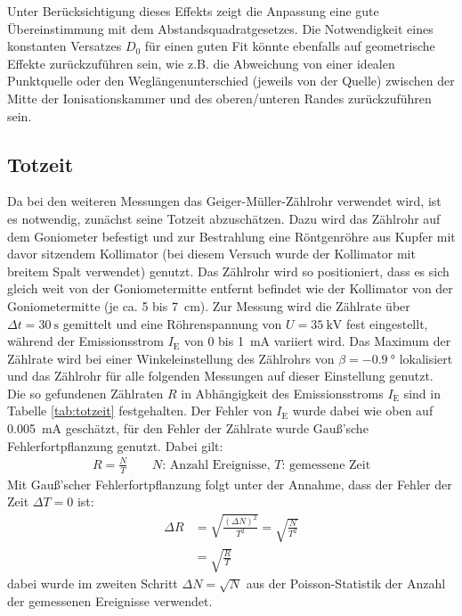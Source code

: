 \documentclass[11pt, a4paper]{article}
\numberwithin{equation}{section}
\begin{document}
Unter Berücksichtigung dieses Effekts zeigt die Anpassung eine gute Übereinstimmung mit dem Abstandsquadratgesetzes.
Die Notwendigkeit eines konstanten Versatzes $D_0$ für einen guten Fit könnte ebenfalls auf geometrische Effekte zurückzuführen sein, wie z.B. die Abweichung von einer idealen Punktquelle oder den Weglängenunterschied (jeweils von der Quelle) zwischen der Mitte der Ionisationskammer und des oberen/unteren Randes zurückzuführen sein.

\subsection{Totzeit}

Da bei den weiteren Messungen das Geiger-Müller-Zählrohr verwendet wird, ist es notwendig, zunächst seine Totzeit abzuschätzen.
Dazu wird das Zählrohr auf dem Goniometer befestigt und zur Bestrahlung eine Röntgenröhre aus Kupfer mit davor sitzendem Kollimator (bei diesem Versuch wurde der Kollimator mit breitem Spalt verwendet) genutzt.
Das Zählrohr wird so positioniert, dass es sich gleich weit von der Goniometermitte entfernt befindet wie der Kollimator von der Goniometermitte (je ca. \num{5} bis \SI{7}{cm}).
Zur Messung wird die Zählrate über $\Delta t=\SI{30}{\second}$ gemittelt und eine Röhrenspannung von $U=\SI{35}{\kilo\volt}$ fest eingestellt, während der Emissionsstrom $I_\text{E}$ von \num{0} bis \SI{1}{\milli\ampere} variiert wird.
Das Maximum der Zählrate wird bei einer Winkeleinstellung des Zählrohrs von $\beta=\SI{-0.9}{\degree}$ lokalisiert und das Zählrohr für alle folgenden Messungen auf dieser Einstellung genutzt.
Die so gefundenen Zählraten $R$ in Abhängigkeit des Emissionsstroms $I_\mathrm{E}$ sind in Tabelle \ref{tab:totzeit} festgehalten.
Der Fehler von $I_\text{E}$ wurde dabei wie oben auf \SI{0.005}{\milli\ampere} geschätzt, für den Fehler der Zählrate wurde Gauß'sche Fehlerfortpflanzung genutzt.
Dabei gilt:
\begin{align}
	R = \frac{N}{T}\qquad\text{$N$: Anzahl Ereignisse, $T$: gemessene Zeit}
\end{align}
Mit Gauß'scher Fehlerfortpflanzung folgt unter der Annahme, dass der Fehler der Zeit $\Delta T=0$ ist:
\begin{align}
	\Delta R &= \sqrt{\frac{(\Delta N)^2}{T^2}} = \sqrt{\frac{N}{T^2}} \nonumber \\
		     &= \sqrt{\frac{R}{T}}
		     \label{eq:zählrate_fehler}
\end{align}
dabei wurde im zweiten Schritt $\Delta N = \sqrt{N}$ aus der Poisson-Statistik der Anzahl der gemessenen Ereignisse verwendet.
\end{document}

